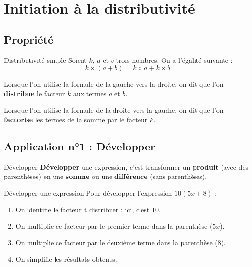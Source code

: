 \documentclass[a4paper]{book}
\begin{document}
\section{Initiation à la distributivité}
\subsection{Propriété}

    \begin{proprieteTitre}{Distributivité simple}
        Soient $k$, $a$ et $b$ trois nombres. On a l'égalité suivante :
        \[ k \times (a + b) = k \times a + k \times b \]
        
        Lorsque l'on utilise la formule de la gauche vers la droite, on dit que l'on \textbf{distribue} le facteur $k$ aux termes $a$ et $b$.

        \medskip

        Lorsque l'on utilise la formule de la droite vers la gauche, on dit que l'on \textbf{factorise} les termes de la somme par le facteur $k$.
    \end{proprieteTitre}
    

\subsection{Application n°1 : Développer}
    \begin{definitionTitre}{Développer}
        \textbf{Développer} une expression, c'est transformer un \textbf{produit} (avec des parenthèses) en une \textbf{somme} ou une \textbf{différence} (sans parenthèses).
    \end{definitionTitre}
    
    
    \begin{methodeTitre}{Développer une expression}
        Pour développer l'expression $10(5x + 8)$ :
        \begin{enumerate}
            \item On identifie le facteur à distribuer : ici, c'est $10$.
            \item On multiplie ce facteur par le premier terme dans la parenthèse ($5x$).
            \item On multiplie ce facteur par le deuxième terme dans la parenthèse ($8$).
            \item On simplifie les résultats obtenus.
        \end{enumerate}
    \end{methodeTitre}
    
\end{document}
